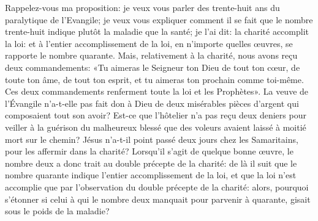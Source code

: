 Rappelez-vous ma proposition:
	je veux vous parler des trente-huit ans du paralytique de l’Evangile;
	je veux vous expliquer comment il se fait
		que le nombre trente-huit indique plutôt la maladie que la santé;
	je l’ai dit: la charité accomplit la loi:
	et à l’entier accomplissement de la loi, en n’importe quelles œuvres,
		se rapporte le nombre quarante.
Mais, relativement à la charité, nous avons reçu deux commandements:
	«Tu aimeras le Seigneur ton Dieu de tout ton cœur,
		de toute ton âme, de tout ton esprit,
	et tu aimeras ton prochain comme toi-même.
Ces deux commandements renferment toute la loi et les Prophètes».
La veuve de l’Évangile n’a-t-elle pas fait don à Dieu
		de deux misérables pièces d’argent qui composaient tout son avoir?
Est-ce que l’hôtelier n’a pas reçu deux deniers
		pour veiller à la guérison du malheureux blessé
	que des voleurs avaient laissé à moitié mort sur le chemin?
Jésus n’a-t-il point passé deux jours chez les Samaritains,
	pour les affermir dans la charité?
Lorsqu’il s’agit de quelque bonne œuvre,
	le nombre deux a donc trait au double précepte de la charité:
	de là il suit que le nombre quarante indique l’entier accomplissement de la loi,
	et que la loi n’est accomplie
		que par l’observation du double précepte de la charité:
	alors, pourquoi s’étonner
		si celui à qui le nombre deux manquait pour parvenir à quarante,
	gisait sous le poids de la maladie?
